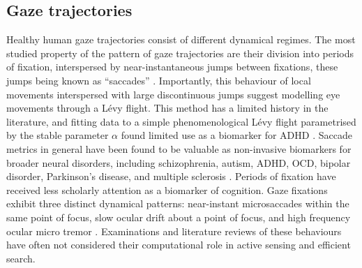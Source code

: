 \subsection{Gaze trajectories}\label{subsec:gaze_traj}
Healthy human gaze trajectories consist of different dynamical regimes. The most studied property of the pattern of gaze trajectories are their division into periods of fixation, interspersed by near-instantaneous jumps between fixations, these jumps being known as ``saccades'' \cite{erkelens_coordination_2006, seung_how_1996, lencastre_dynamical_2025, benitezy_eyetracking_1970}. Importantly, this behaviour of local movements interspersed with large discontinuous jumps suggest modelling eye movements through a Lévy flight. This method has a limited history in the literature, and fitting data to a simple phenomenological Lévy flight parametrised by the stable parameter $\alpha$ found limited use as a biomarker for ADHD \cite{papanikolaou_levy_2024}. Saccade metrics in general have been found to be valuable as non-invasive biomarkers for broader neural disorders, including schizophrenia, autism, ADHD, OCD, bipolar disorder, Parkinson's disease, and multiple sclerosis \cite{morita_eye_2017, bittencourt_saccadic_2013,zhu_diagnosis_2024, caldani_saccadic_2017, wang_saccadic_2025}. Periods of fixation have received less scholarly attention as a biomarker of cognition. Gaze fixations exhibit three distinct dynamical patterns: near-instant microsaccades within the same point of focus, slow ocular drift about a point of focus, and high frequency ocular micro tremor \cite{van_ede_looking_2026,graham_ocular_2023, engbert_integrated_2011, spauschus_origin_1999}. Examinations and literature reviews of these behaviours have often not considered their computational role in active sensing and efficient search.

